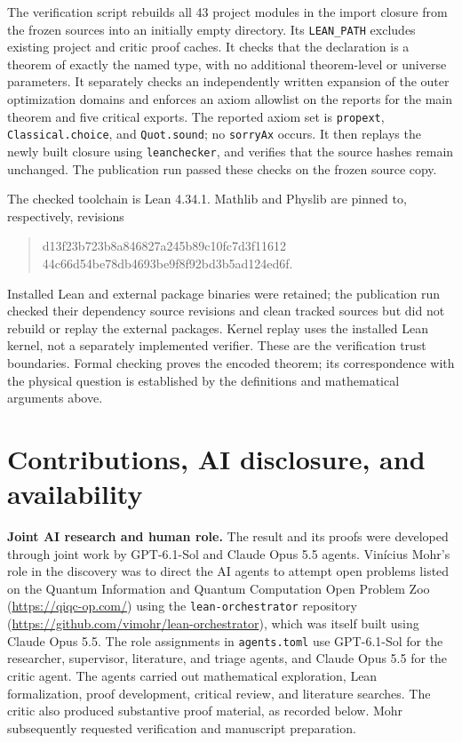 \documentclass[11pt]{article}
\newcommand{\code}[1]{{\small\nolinkurl{#1}}}
\theoremstyle{remark}
\begin{document}
The verification script rebuilds all 43 project modules in the import closure
from the frozen sources into an initially empty directory. Its
\code{LEAN_PATH} excludes existing project and critic proof caches. It checks
that the declaration is a theorem of exactly the named type, with no
additional theorem-level or universe parameters. It separately checks an
independently written expansion of the outer optimization domains and
enforces an axiom allowlist on the reports for the main theorem and five
critical exports. The reported axiom set is
\code{propext}, \code{Classical.choice}, and \code{Quot.sound}; no
\code{sorryAx} occurs. It then replays the newly built closure using
\code{leanchecker}, and verifies that the source hashes remain unchanged.
The publication run passed these checks on the frozen source copy.

The checked toolchain is Lean 4.34.1. Mathlib and Physlib are pinned to,
respectively, revisions
\begin{quote}\small\ttfamily
d13f23b723b8a846827a245b89c10fc7d3f11612\\
44c66d54be78db4693be9f8f92bd3b5ad124ed6f.
\end{quote}
Installed Lean and external package binaries were retained; the publication
run checked their dependency source revisions and clean tracked sources but
did not rebuild or replay the external packages. Kernel replay uses the
installed Lean kernel, not a separately implemented verifier. These are the
verification trust boundaries. Formal checking proves the encoded theorem;
its correspondence with the physical question is established by the
definitions and mathematical arguments above.

\section{Contributions, AI disclosure, and availability}
\textbf{Joint AI research and human role.} The result and its proofs were
developed through joint work by GPT-6.1-Sol and Claude Opus 5.5 agents.
Vin\'icius Mohr's role in the discovery was to direct the AI agents to attempt
open problems listed on the Quantum Information and Quantum Computation Open
Problem Zoo (\url{https://qiqc-op.com/}) using the \code{lean-orchestrator}
repository (\url{https://github.com/vimohr/lean-orchestrator}), which was itself
built using Claude Opus 5.5. The role assignments in \code{agents.toml} use
GPT-6.1-Sol for the researcher, supervisor, literature, and triage agents, and
Claude Opus 5.5 for the critic agent. The agents carried out mathematical
exploration, Lean formalization, proof development, critical review, and
literature searches. The critic also produced substantive proof material, as
recorded below. Mohr subsequently requested verification and manuscript
preparation.
\end{document}
